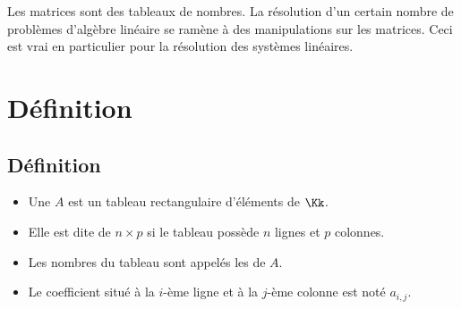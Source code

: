 \documentclass[class=report,crop=false]{standalone}
\begin{document}








\bigskip
\bigskip
\bigskip


Les matrices sont des tableaux de nombres. La résolution d'un
certain nombre de problèmes d'algèbre linéaire se ramène
à des manipulations sur les matrices. Ceci est vrai en particulier
pour la résolution des systèmes linéaires.

\medskip



\section{Définition}


\subsection{Définition}

\begin{definition}
\sauteligne
\begin{itemize}
  \item Une  $A$ est un tableau rectangulaire
d'éléments de $\Kk$.
  \item Elle est dite de  $n \times p$ si le tableau
possède $n$ lignes et $p$ colonnes.
  \item Les nombres du tableau sont appelés les  de $A$.
  \item Le coefficient situé à  la $i$-ème ligne et à la $j$-ème colonne
  est noté $a_{i,j}$.
\end{itemize}
\end{definition}
\end{document}
